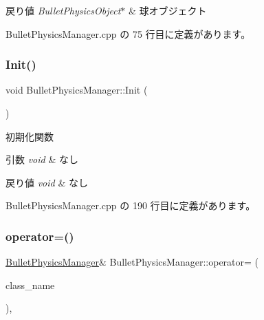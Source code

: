 \begin{DoxyRetVals}{戻り値}
{\em Bullet\+Physics\+Object$\ast$} & 球オブジェクト \\
\hline
\end{DoxyRetVals}


 Bullet\+Physics\+Manager.\+cpp の 75 行目に定義があります。

\mbox{\label{class_bullet_physics_manager_a9e68a60ba0017f5479cf3a21ce4a5703}} 
\subsubsection{\texorpdfstring{Init()}{Init()}}
{\footnotesize\ttfamily void Bullet\+Physics\+Manager\+::\+Init (\begin{DoxyParamCaption}{ }\end{DoxyParamCaption})}



初期化関数 


\begin{DoxyParams}{引数}
{\em void} & なし \\
\hline
\end{DoxyParams}

\begin{DoxyRetVals}{戻り値}
{\em void} & なし \\
\hline
\end{DoxyRetVals}


 Bullet\+Physics\+Manager.\+cpp の 190 行目に定義があります。

\mbox{\label{class_bullet_physics_manager_a179d9a6da3f1b96efbe091419968b53c}} 
\subsubsection{\texorpdfstring{operator=()}{operator=()}}
{\footnotesize\ttfamily \mbox{\hyperlink{class_bullet_physics_manager}{Bullet\+Physics\+Manager}}\& Bullet\+Physics\+Manager\+::operator= (\begin{DoxyParamCaption}\item[{const \mbox{\hyperlink{class_bullet_physics_manager}{Bullet\+Physics\+Manager}} \&}]{class\+\_\+name }\end{DoxyParamCaption})\hspace{0.3cm}{\ttfamily [private]}, {\ttfamily [delete]}}

